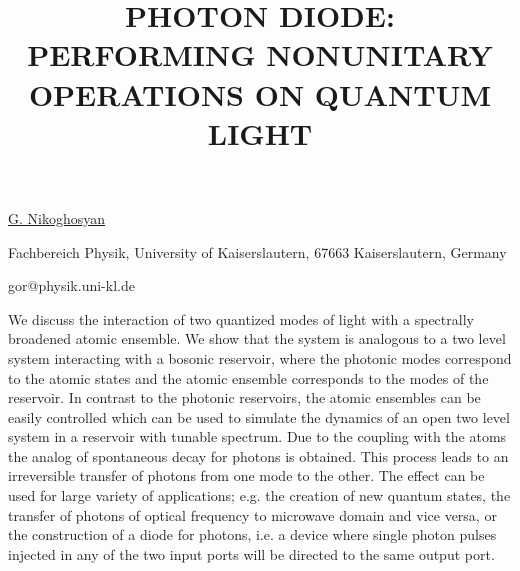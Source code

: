 \title{PHOTON DIODE: PERFORMING NONUNITARY \mbox{OPERATIONS} ON QUANTUM LIGHT}

\underline{G. Nikoghosyan} 

\vspace{-4mm}
{\normalsize{Fachbereich Physik,
University of Kaiserslautern,
67663 Kaiserslautern,
Germany

\email gor@physik.uni-kl.de}}

We discuss the interaction of two quantized modes of light with a
spectrally broadened atomic ensemble. We show that the system is
analogous to a two level system interacting with a bosonic
reservoir, where the photonic modes correspond to the atomic states
and the atomic ensemble corresponds to the modes of the reservoir.
In contrast to the photonic reservoirs, the atomic ensembles can be
easily controlled which can be used to simulate the dynamics of an
open two level system in a reservoir with tunable spectrum. Due to
the coupling with the atoms the analog of spontaneous decay for
photons is obtained. This process leads to an irreversible transfer
of photons from one mode to the other. The effect can be used for
large variety of applications; e.g. the creation of new quantum
states, the transfer of photons of optical frequency to microwave
domain and vice versa, or the construction of a diode for photons,
i.e. a device where single photon pulses injected in any of the two
input ports will be directed to the same output port.

\vspace{\baselineskip}